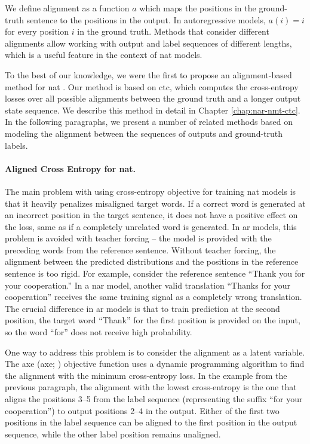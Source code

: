 We define alignment as a function $a$ which maps the positions in the
ground-truth sentence to the positions in the output. In autoregressive models,
$a(i) = i$ for every position $i$ in the ground truth. %
Methods that consider different alignments allow working with output and label
sequences of different lengths, which is a useful feature in the context of
\ac{nat} models.

To the best of our knowledge, we were the first to propose an alignment-based
method for \ac{nat} \citep{libovicky-helcl-2018-end}. Our method is based on
\acf{ctc}, which computes the cross-entropy losses over all
possible alignments between the ground truth and a longer output state
sequence. We describe this method in detail in Chapter \ref{chap:nar-nmt-ctc}.
In the following paragraphs, we present a number of related methods based on
modeling the alignment between the sequences of outputs and ground-truth
labels.

\paragraph{Aligned Cross Entropy for \ac{nat}.} The main problem with using
cross-entropy objective for training \ac{nat} models is that it heavily
penalizes misaligned target words. If a correct word is generated at an
incorrect position in the target sentence, it does not have a positive effect
on the loss, same as if a completely unrelated word is generated. In \acl{ar}
models, this problem is avoided with teacher forcing -- the model is provided
with the preceding words from the reference sentence. Without teacher forcing,
the alignment between the predicted distributions and the positions in the
reference sentence is too rigid. For example, consider the reference sentence
``Thank you for your cooperation.'' In a \acl{nar} model, another valid
translation ``Thanks for your cooperation'' receives the same training signal
as a completely wrong translation. The crucial difference in \ac{ar} models is
that to train prediction at the second position, the target word ``Thank'' for
the first position is provided on the input, so the word ``for'' does not
receive high probability.

One way to address this problem is to consider the alignment as a latent
variable.  The \acl{axe}  (\acs{axe};
\citealp{ghazvininejad2020aligned}) objective function uses a dynamic
programming algorithm to find the alignment with the minimum cross-entropy
loss. In the example from the previous paragraph, the alignment with the lowest
cross-entropy is the one that aligns the positions 3--5 from the label sequence
(representing the suffix ``for your cooperation'') to output positions 2--4 in
the output. Either of the first two positions in the label sequence can be
aligned to the first position in the output sequence, while the other label
position remains unaligned. 

